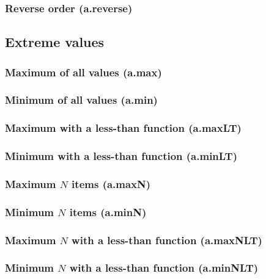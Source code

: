 \documentclass{article}
\theoremstyle{definition}
\begin{document}
\subsubsection{Reverse order (a.reverse)}

\subsection{Extreme values}

\subsubsection{Maximum of all values (a.max)}

\subsubsection{Minimum of all values (a.min)}

\subsubsection{Maximum with a less-than function (a.maxLT)}

\subsubsection{Minimum with a less-than function (a.minLT)}

\subsubsection{Maximum $N$ items (a.maxN)}

\subsubsection{Minimum $N$ items (a.minN)}

\subsubsection{Maximum $N$ with a less-than function (a.maxNLT)}

\subsubsection{Minimum $N$ with a less-than function (a.minNLT)}
\end{document}
